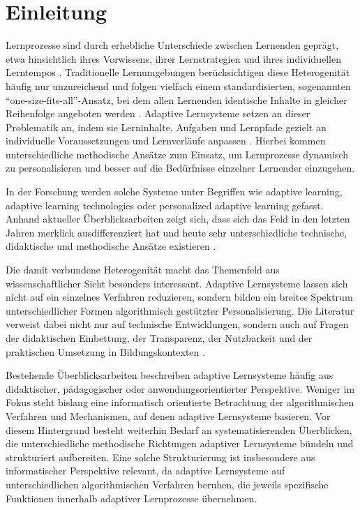 
\chapter{Einleitung}\label{einleitung}

Lernprozesse sind durch erhebliche Unterschiede zwischen Lernenden
geprägt, etwa hinsichtlich ihres Vorwissens, ihrer Lernstrategien und
ihres individuellen Lerntempos \citep{Wang2025}. Traditionelle
Lernumgebungen berücksichtigen diese Heterogenität häufig nur
unzureichend und folgen vielfach einem standardisierten, sogenannten
\enquote{one-size-fits-all}-Ansatz, bei dem allen Lernenden identische
Inhalte in gleicher Reihenfolge angeboten werden \citep{Sibley2024}.
Adaptive Lernsysteme setzen an dieser Problematik an, indem sie
Lerninhalte, Aufgaben und Lernpfade gezielt an individuelle
Voraussetzungen und Lernverläufe anpassen \citep{Wang2025}. Hierbei
kommen unterschiedliche methodische Ansätze zum Einsatz, um Lernprozesse
dynamisch zu personalisieren und besser auf die Bedürfnisse einzelner
Lernender einzugehen.

In der Forschung werden solche Systeme unter Begriffen wie adaptive
learning, adaptive learning technologies oder personalized adaptive
learning gefasst. Anhand aktueller Überblicksarbeiten zeigt sich, dass
sich das Feld in den letzten Jahren merklich ausdifferenziert hat und
heute sehr unterschiedliche technische, didaktische und methodische
Ansätze existieren \citep{Gligorea2023, duPlooy2024}.

Die damit verbundene Heterogenität macht das Themenfeld aus
wissenschaftlicher Sicht besonders interessant. Adaptive Lernsysteme
lassen sich nicht auf ein einzelnes Verfahren reduzieren, sondern bilden
ein breites Spektrum unterschiedlicher Formen algorithmisch gestützter
Personalisierung. Die Literatur verweist dabei nicht nur auf technische
Entwicklungen, sondern auch auf Fragen der didaktischen Einbettung, der
Transparenz, der Nutzbarkeit und der praktischen Umsetzung in
Bildungskontexten \citep{Alajlani2024, Simon2024}.

Bestehende Überblicksarbeiten beschreiben adaptive Lernsysteme häufig
aus didaktischer, pädagogischer oder anwendungsorientierter Perspektive.
Weniger im Fokus steht bislang eine informatisch orientierte Betrachtung
der algorithmischen Verfahren und Mechanismen, auf denen adaptive
Lernsysteme basieren. Vor diesem Hintergrund besteht weiterhin Bedarf an
systematisierenden Überblicken, die unterschiedliche methodische
Richtungen adaptiver Lernsysteme bündeln und strukturiert aufbereiten.
Eine solche Strukturierung ist insbesondere aus informatischer
Perspektive relevant, da adaptive Lernsysteme auf unterschiedlichen
algorithmischen Verfahren beruhen, die jeweils spezifische Funktionen
innerhalb adaptiver Lernprozesse übernehmen.

